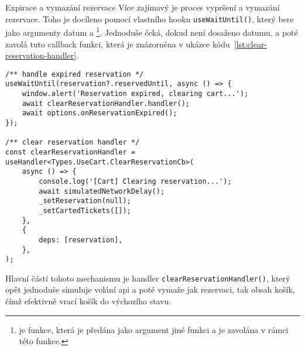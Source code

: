 \begin{subsection}{Expirace a vymazání rezervace}
    \label{subsec:implementace-rezervace-expirace}
    Více zajímavý je proces vypršení a vymazání rezervace.
    Toho je docíleno pomocí vlastního hooku \texttt{useWaitUntil()}, který bere jako argumenty datum a \footnote{ je funkce, která je předána jako argument jiné funkci a je zavolána v rámci této funkce.}.
    Jednoduše čeká, dokud není dosaženo datumu, a poté zavolá tuto callback funkci, která je znázorněna v ukázce kódu~\ref{lst:clear-reservation-handler}.

    \begin{listing}[H]
        \begin{verbatim}
/** handle expired reservation */
useWaitUntil(reservation?.reservedUntil, async () => {
	window.alert('Reservation expired, clearing cart...');
	await clearReservationHandler.handler();
	await options.onReservationExpired();
});

/** clear reservation handler */
const clearReservationHandler = useHandler<Types.UseCart.ClearReservationCb>(
	async () => {
		console.log('[Cart] Clearing reservation...');
		await simulatedNetworkDelay();
		_setReservation(null);
		_setCartedTickets([]);
	},
	{
		deps: [reservation],
	},
);
        \end{verbatim}
        \caption{Proces expirace rezervace s metodou \texttt{clearReservationHandler()}}
        \label{lst:clear-reservation-handler}
    \end{listing}

    Hlavní částí tohoto mechanismu je handler \texttt{clearReservationHandler()}, který opět jednoduše simuluje volání \ac{api} a poté vymaže jak rezervaci, tak obsah košík, čímž efektivně vrací košík do výchozího stavu.
\end{subsection}

